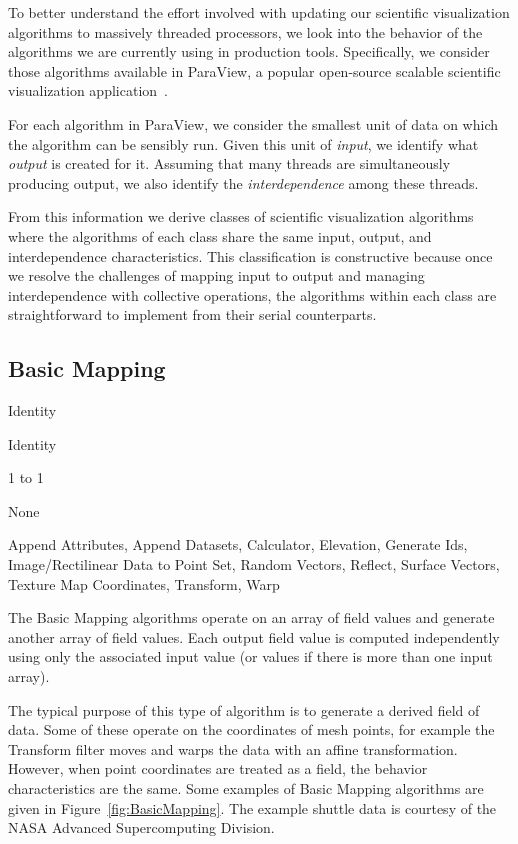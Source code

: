 \documentclass{sig-alternate}
\newcommand*{\lcite}[1]{~\cite{#1}}
\newcommand*{\keyterm}[1]{\emph{#1}}
\newcommand{\algclass}[1]{\textsf{#1}}
\newcommand{\alg}[1]{#1}
\newcommand{\algorithmclasssection}[1]{\subsection*{#1}}
\newcommand{\algorithmclass}[6]{
  \algorithmclasssection{#1} %
  \begin{description}[leftmargin=9em,style=nextline,noitemsep]
    \raggedright
  \item[Point Mapping] #2
  \item[Cell Mapping] #3
  \item[Field Mapping] #4
  \item[Collective Work] #5
  \item[Algorithms] #6
  \end{description}
}
\begin{document}
\noindent
To better understand the effort involved with updating our scientific
visualization algorithms to massively threaded processors, we look into the
behavior of the algorithms we are currently using in production
tools. Specifically, we consider those algorithms available in ParaView, a
popular open-source scalable scientific visualization
application\lcite{ParaView}.

For each algorithm in ParaView, we consider the smallest unit of data on
which the algorithm can be sensibly run. Given this unit of
\keyterm{input}, we identify what \keyterm{output} is created for
it. Assuming that many threads are simultaneously producing output, we also
identify the \keyterm{interdependence} among these threads.

From this information we derive classes of scientific visualization
algorithms where the algorithms of each class share the same input,
output, and interdependence characteristics. This classification is
constructive because once we resolve the challenges of mapping input to
output and managing interdependence with collective operations, the
algorithms within each class are straightforward to implement from their
serial counterparts.

\algorithmclass{Basic Mapping}
               {Identity} %
               {Identity} %
               {1 to 1} %
               {None} %
               {
                 Append Attributes,
                 Append Datasets,
                 Calculator,
                 Elevation,
                 Generate Ids,
                 Image/Rectilinear Data to Point Set,
                 Random Vectors,
                 Reflect,
                 Surface Vectors,
                 Texture Map Coordinates,
                 Transform,
                 Warp
               }

\noindent
The \algclass{Basic Mapping} algorithms operate on an array of field values
and generate another array of field values. Each output field value is
computed independently using only the associated input value (or values if
there is more than one input array).

The typical purpose of this type of algorithm is to generate a derived
field of data. Some of these operate on the coordinates of mesh points, for
example the \alg{Transform} filter moves and warps the data with an affine
transformation. However, when point coordinates are treated as a field, the
behavior characteristics are the same. Some examples of \algclass{Basic
  Mapping} algorithms are given in Figure~\ref{fig:BasicMapping}. The
example shuttle data is courtesy of the NASA Advanced Supercomputing
Division.
\end{document}
